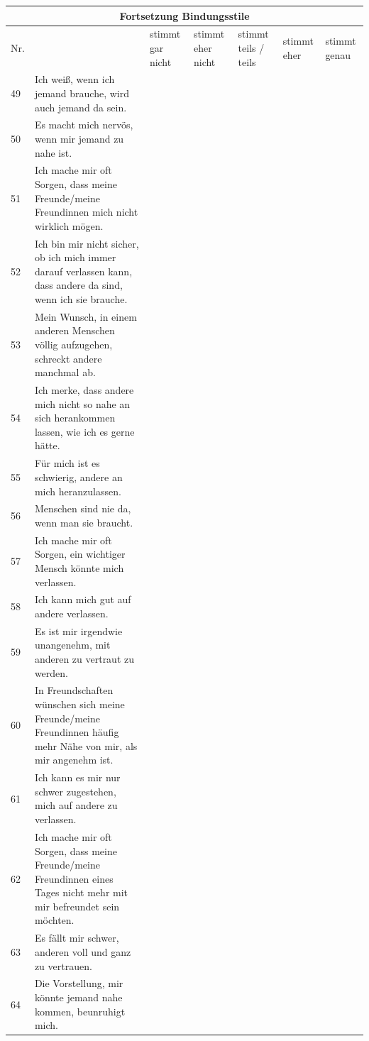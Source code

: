 \begin{flushleft}
\begin{longtable}[c]{ |p{1em}|p{14em}|p{3em}|p{3em}|p{3em}|p{3em}|p{3em}|}
  \hline
  \multicolumn{7}{|c|}{ Fortsetzung Bindungsstile}\\
  \hline
  Nr. & & stimmt gar nicht & stimmt eher nicht & stimmt teils / teils & stimmt eher & stimmt genau \\
  \hline
  \endhead
 
  \hline
  \endfoot
 
  \hline\hline
  \endlastfoot
  
  49 & Ich weiß, wenn ich jemand brauche, wird auch jemand da sein. & & & & & \\
  50 & Es macht mich nervös, wenn mir jemand zu nahe ist.& & & & & \\
  51 & Ich mache mir oft Sorgen, dass meine Freunde/meine Freundinnen mich nicht wirklich mögen. & & & & & \\
  52 &Ich bin mir nicht sicher, ob ich mich immer darauf verlassen kann, dass andere da sind, wenn ich sie brauche. & & & & & \\
  53 & Mein Wunsch, in einem anderen Menschen völlig aufzugehen, schreckt andere manchmal ab.& & & & & \\
  54 & Ich merke, dass andere mich nicht so nahe an sich herankommen lassen, wie ich es gerne hätte.& & & & & \\
  55 & Für mich ist es schwierig, andere an mich heranzulassen.& & & & & \\
  56 & Menschen sind nie da, wenn man sie braucht.& & & & & \\
  57 & Ich mache mir oft Sorgen, ein wichtiger Mensch könnte mich verlassen.& & & & & \\
  58 & Ich kann mich gut auf andere verlassen. & & & & & \\
  59 & Es ist mir irgendwie unangenehm, mit anderen zu vertraut zu werden.& & & & & \\
  60 & In Freundschaften wünschen sich meine Freunde/meine Freundinnen häufig mehr Nähe von mir, als mir angenehm ist.& & & & & \\
  61 & Ich kann es mir nur schwer zugestehen, mich auf andere zu verlassen.& & & & & \\
  62 & Ich mache mir oft Sorgen, dass meine Freunde/meine Freundinnen eines Tages nicht mehr mit mir befreundet sein möchten.& & & & & \\
  63 & Es fällt mir schwer, anderen voll und ganz zu vertrauen.& & & & & \\
  64 & Die Vorstellung, mir könnte jemand nahe kommen, beunruhigt mich. & & & & & \\
  

\end{longtable}
\end{flushleft}
